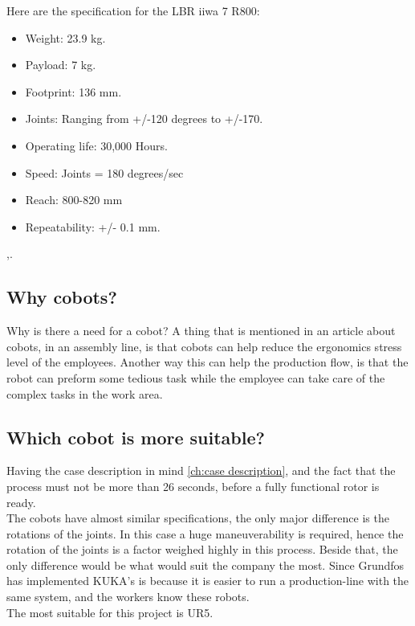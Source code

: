 Here are the specification for the LBR iiwa 7 R800:\\

\begin{itemize}
    \item Weight: 23.9 kg.
    \item Payload: 7 kg.
    \item Footprint: 136 mm.
    \item Joints: Ranging from +/-120 degrees to +/-170.
    \item Operating life: 30,000 Hours.
    \item Speed: Joints = 180 degrees/sec
    \item Reach: 800-820 mm
    \item Repeatability: +/- 0.1 mm.
\end{itemize}
\cite{KukaSpec1},\cite{KukaSpec2}.

\subsection{Why cobots?}\label{ch:Whycobot}
Why is there a need for a cobot? A thing that is mentioned in an article about cobots, in an assembly line, is that cobots can help reduce the ergonomics stress level of the employees\cite{Coboau}. Another way this can help the production flow, is that the robot can preform some tedious task while the employee can take care of the complex tasks in the work area.\\

\subsection{Which cobot is more suitable?}

Having the case description in mind \ref{ch:case description}, and the fact that the process must not be more than 26 seconds, before a fully functional rotor is ready.\\
The cobots have almost similar specifications, the only major difference is the rotations of the joints. In this case a huge maneuverability is required, hence the rotation of the joints is a factor weighed highly in this process. Beside that, the only difference would be what would suit the company the most. Since Grundfos has implemented KUKA's is because it is easier to run a production-line with the same system, and the workers know these robots.\\
The most suitable for this project is UR5.

